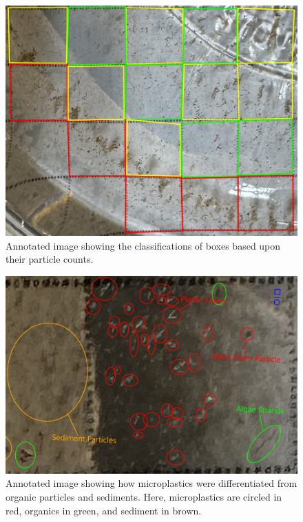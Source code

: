 \documentclass[fleqn,10pt]{SelfArx} %
\begin{document}
	\begin{figure}[h]
		\centering
		\includegraphics[width=1\linewidth]{Figures/BoxClasses}
		\caption[Box Classifications]{Annotated image showing the classifications of boxes based upon their particle counts.}
		\label{fig:boxclasses}
	\end{figure}
	\begin{figure}[h]
		\centering
		\includegraphics[width=1\linewidth]{Figures/MPsClassification}
		\caption[Annotated Collected Particles]{Annotated image showing how microplastics were differentiated from organic particles and sediments. Here, microplastics are circled in red, organics in green, and sediment in brown.}
		\label{fig:MPClassification}
	\end{figure}
\end{document}
